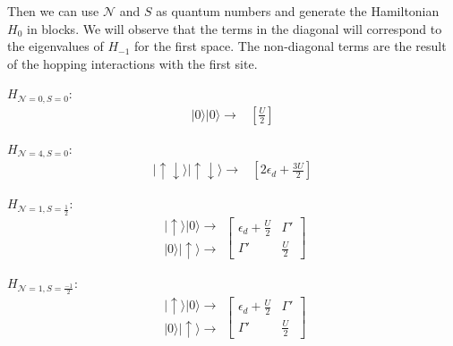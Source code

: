  Then we can use  $\mathcal{N}$ and $S$ as quantum numbers and generate the Hamiltonian $H_{0}$ in blocks. We will observe that the terms in the diagonal will correspond to the eigenvalues of $H_{-1}$ for the first space. The non-diagonal terms are the result of the hopping interactions with the first site. 

\begin{multicols}{2}

$H_{\mathcal{N}=0,S=0}:$
\[
\begin{array}{c}
\vert0\rangle\vert0\rangle\rightarrow\end{array}\begin{array}{c}
\left[\frac{U}{2}\right]\end{array}
\]


$H_{\mathcal{N}=4,S=0}:$
\[
\begin{array}{c}
\vert\uparrow\!\downarrow\rangle\vert\uparrow\!\downarrow\rangle\rightarrow\end{array}\begin{array}{c}
\left[2\epsilon_{d}+\frac{3U}{2}\right]\end{array}
\]


\end{multicols}

\begin{multicols}{2}

$H_{\mathcal{N}=1,S=\frac{1}{2}}:$
\[
\begin{array}{c}
\vert\uparrow\rangle\vert0\rangle\rightarrow\\
\vert0\rangle\vert\uparrow\rangle\rightarrow
\end{array}\left[\begin{array}{cc}
\epsilon_{d}+\frac{U}{2} & \Gamma'\\
\Gamma' & \frac{U}{2}
\end{array}\right]
\]


$H_{\mathcal{N}=1,S=\frac{-1}{2}}:$
\[
\begin{array}{c}
\vert\uparrow\rangle\vert0\rangle\rightarrow\\
\vert0\rangle\vert\uparrow\rangle\rightarrow
\end{array}\left[\begin{array}{cc}
\epsilon_{d}+\frac{U}{2} & \Gamma'\\
\Gamma' & \frac{U}{2}
\end{array}\right]
\]


\end{multicols}

